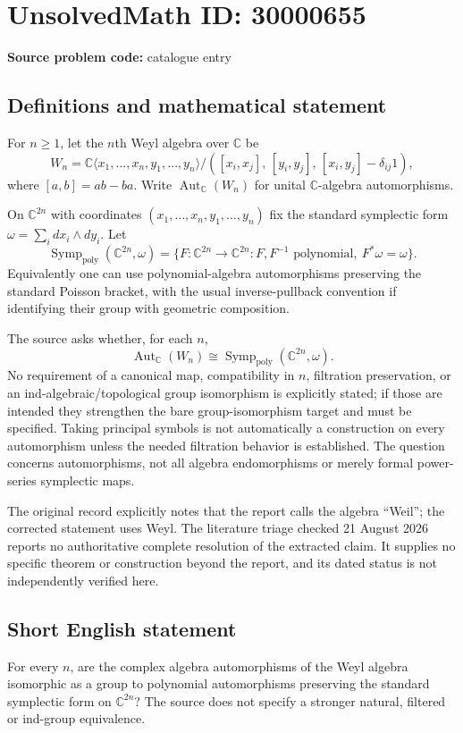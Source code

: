 \documentclass[11pt]{article}
\newcommand{\C}{\mathbb{C}}
\begin{document}
\section*{UnsolvedMath ID: 30000655}
\textbf{Source problem code:} catalogue entry
\subsection{Definitions and mathematical statement}
For $n\geq1$, let the $n$th Weyl algebra over $\C$ be
\[
 W_n=\C\langle x_1,\ldots,x_n,y_1,\ldots,y_n\rangle/
 ([x_i,x_j],\,[y_i,y_j],\,[x_i,y_j]-\delta_{ij}1),
\]
where $[a,b]=ab-ba$. Write $\operatorname{Aut}_{\C}(W_n)$ for unital $\C$-algebra automorphisms.

On $\C^{2n}$ with coordinates $(x_1,\ldots,x_n,y_1,\ldots,y_n)$ fix the standard symplectic form $\omega=\sum_i dx_i\wedge dy_i$. Let
\[
 \operatorname{Symp}_{\mathrm{poly}}(\C^{2n},\omega)
 =\{F:\C^{2n}\to\C^{2n}: F,F^{-1}\text{ polynomial},\ F^*\omega=\omega\}.
\]
Equivalently one can use polynomial-algebra automorphisms preserving the standard Poisson bracket, with the usual inverse-pullback convention if identifying their group with geometric composition.

The source asks whether, for each $n$,
\[
 \operatorname{Aut}_{\C}(W_n)
       \cong\operatorname{Symp}_{\mathrm{poly}}(\C^{2n},\omega).
\]
No requirement of a canonical map, compatibility in $n$, filtration preservation, or an ind-algebraic/topological group isomorphism is explicitly stated; if those are intended they strengthen the bare group-isomorphism target and must be specified. Taking principal symbols is not automatically a construction on every automorphism unless the needed filtration behavior is established. The question concerns automorphisms, not all algebra endomorphisms or merely formal power-series symplectic maps.

The original record explicitly notes that the report calls the algebra ``Weil''; the corrected statement uses Weyl. The literature triage checked 21 August 2026 reports no authoritative complete resolution of the extracted claim. It supplies no specific theorem or construction beyond the report, and its dated status is not independently verified here.
\subsection{Short English statement}
For every $n$, are the complex algebra automorphisms of the Weyl algebra isomorphic as a group to polynomial automorphisms preserving the standard symplectic form on $\C^{2n}$? The source does not specify a stronger natural, filtered or ind-group equivalence.
\end{document}
